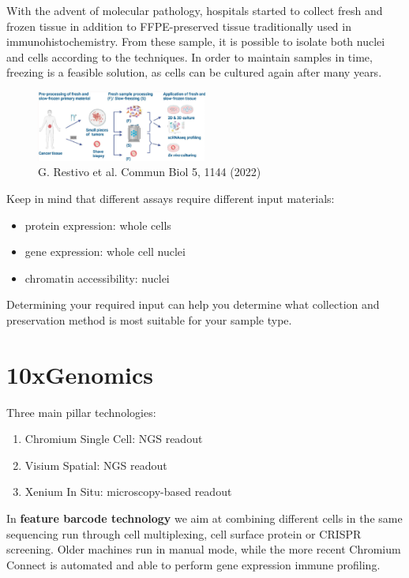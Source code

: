 With the advent of molecular pathology, hospitals started to collect
fresh and frozen tissue in addition to FFPE-preserved tissue
traditionally used in immunohistochemistry. From these sample, it is
possible to isolate both nuclei and cells according to the techniques.
In order to maintain samples in time, freezing is a feasible solution,
as cells can be cultured again after many years.

\begin{figure}
\centering
\includegraphics[width=0.5\textwidth]{images/Screenshot_3.png}
\caption{G. Restivo et al. Commun Biol 5, 1144 (2022)}
\end{figure}

Keep in mind that different assays require different input materials:

\begin{itemize}
\tightlist
\item
  protein expression: whole cells
\item
  gene expression: whole cell nuclei
\item
  chromatin accessibility: nuclei
\end{itemize}

Determining your required input can help you determine what collection
and preservation method is most suitable for your sample type.

\hypertarget{xgenomics}{%
\section{10xGenomics}\label{xgenomics}}

Three main pillar technologies:

\begin{enumerate}
\def\labelenumi{\arabic{enumi}.}
\tightlist
\item
  Chromium Single Cell: NGS readout
\item
  Visium Spatial: NGS readout
\item
  Xenium In Situ: microscopy-based readout
\end{enumerate}

In \textbf{feature barcode technology} we aim at combining different
cells in the same sequencing run through cell multiplexing, cell surface
protein or CRISPR screening. Older machines run in manual mode, while
the more recent Chromium Connect is automated and able to perform gene
expression immune profiling.

